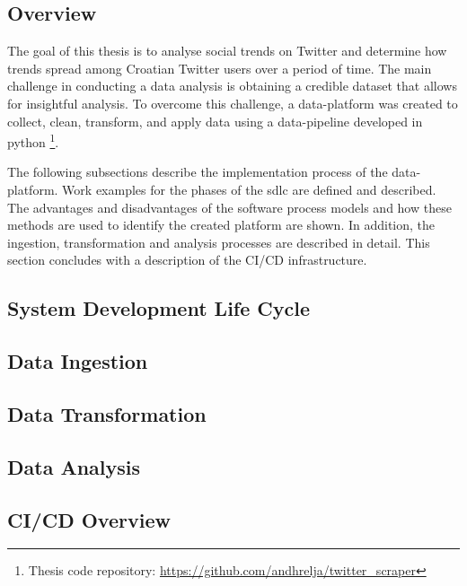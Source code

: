 \subsection{Overview}
\label{sec:methods-overview}

The goal of this thesis is to analyse social trends on Twitter and determine how trends spread among Croatian Twitter users over a period of time. The main challenge in conducting a data analysis is obtaining a credible dataset that allows for insightful analysis. To overcome this challenge, a \gls{data-platform} \cite{moses_gavish_2022} was created to collect, clean, transform, and apply data using a \gls{data-pipeline} developed in \gls{python} \footnote{Thesis code repository: \href{https://github.com/andhrelja/twitter\_scraper}{https://github.com/andhrelja/twitter\_scraper}}.

The following subsections describe the implementation process of the \gls{data-platform}. Work examples for the phases of the \acrfull{sdlc} are defined and described. The advantages and disadvantages of the software process models and how these methods are used to identify the created platform are shown. In addition, the ingestion, transformation and analysis processes are described in detail. This section concludes with a description of the CI/CD infrastructure.


\subsection{System Development Life Cycle}
\label{sec:methods-sdlc}


\clearpage
\subsection{Data Ingestion}
\label{sec:methods-data-ingestion}


\clearpage
\subsection{Data Transformation}
\label{sec:methods-data-transformation}


\clearpage
\subsection{Data Analysis}
\label{sec:methods-data-analysis}


\clearpage
\subsection{CI/CD Overview}
\label{sec:methods-cicd}

